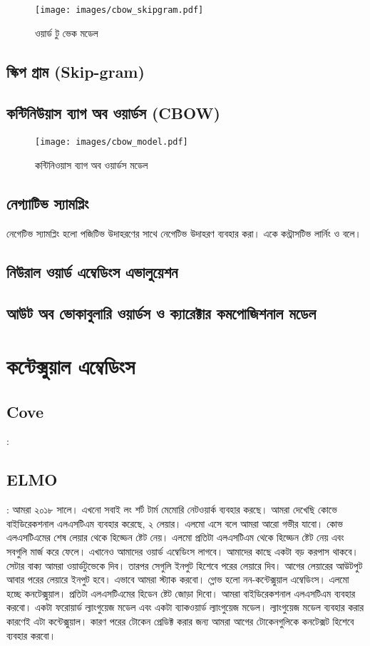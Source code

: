 \documentclass{book}
\begin{document}
\begin{figure}[htbp] %
   \centering
   \texttt{[image: images/cbow\_skipgram.pdf]} 
   \caption{ওয়ার্ড টু ভেক মডেল}
   \label{fig:cbowskipgram}
\end{figure} 


\subsection{স্কিপ গ্রাম (Skip-gram)}
\subsection{কন্টিনিউয়াস ব্যাগ অব ওয়ার্ডস (CBOW)}
\begin{figure}[htbp] %
   \centering
   \texttt{[image: images/cbow\_model.pdf]} 
   \caption{কন্টিনিওয়াস ব্যাগ অব ওয়ার্ডস মডেল}
   \label{fig:cbow}
\end{figure} 

\subsection{নেগ্যাটিভ স্যামপ্লিং}
নেগেটিভ স্যামপ্লিং হলো পজিটিভ উদাহরণের সাথে নেগেটিভ উদাহরণ ব্যবহার করা। একে কন্ট্রাসটিভ লার্নিং ও বলে। 
\subsection{নিউরাল ওয়ার্ড এম্বেডিংস এভালুয়েশন }

\subsection{আউট অব ভোকাবুলারি ওয়ার্ডস ও ক্যারেক্টার কমপোজিশনাল মডেল}

\section{কন্টেক্সুয়াল এম্বেডিংস}
\subsection{Cove}: 
\subsection{ELMO}: আমরা ২০১৮ সালে। এখনো সবাই লং শর্ট টার্ম মেমোরি নেটওয়ার্ক ব্যবহার করছে। আমরা দেখেছি কোভে বাইডিরেকশনাল এলএসটিএম ব্যবহার করেছে, ২ লেয়ার। এলমো এসে বলে আমরা আরো গভীর যাবো। কোভ এলএসটিএমের শেষ লেয়ার থেকে হিড্ডেন ষ্টেট নেয়।  এলমো প্রতিটা এলএসটিএম থেকে হিড্ডেন ষ্টেট নেয় এবং সবগুলি মার্জ করে ফেলে। এখানেও আমাদের ওয়ার্ড এম্বেডিংস লাগবে। আমাদের কাছে একটা বড় করপাস থাকবে। সেটার বাক্য আমরা ওয়ার্ডটুভেকে দিব। তারপর সেগুলি ইনপুট হিশেবে পরের লেয়ারে দিব। আগের লেয়ারের আউটপুট আবার পরের লেয়ারে ইনপুট হবে। এভাবে আমরা স্ট্যাক করবো। গ্লোভ হলো নন-কন্টেক্সুয়াল এম্বেডিংস। এলমো হচ্ছে কনটেক্সুয়াল। প্রতিটা এলএসটিএমের হিডেন ষ্টেট জোড়া দিবো। আমরা বাইডিরেকশনাল এলএসটিএম ব্যবহার করবো। একটা ফরোয়ার্ড ল্যাংগুয়েজ মডেল এবং একটা ব্যাকওয়ার্ড ল্যাংগুয়েজ মডেল। ল্যাংগুয়েজ মডেল ব্যবহার করার কারণেই এটা কন্টেক্সুয়াল। কারণ পরের টোকেন প্রেডিক্ট করার জন্য আমরা আগের টোকেনগুলিকে কনটেক্সট হিশেবে ব্যবহার করবো। 
\end{document}
